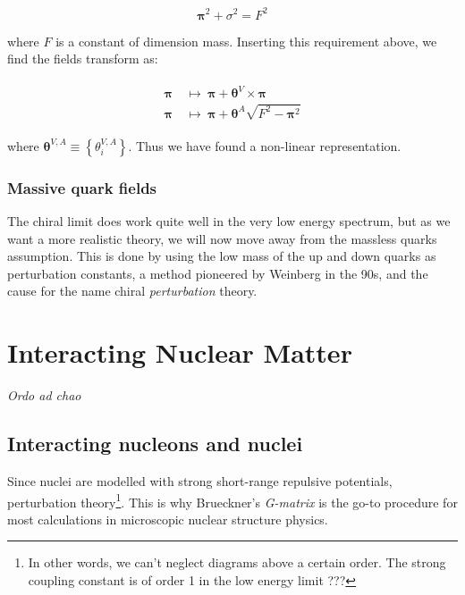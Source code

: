 \documentclass[10pt]{report}
\begin{document}
	\begin{equation}
		\bm{\pi}^2 + \sigma^2 = F^2
	\end{equation}
	
	where $F$ is a constant of dimension mass. Inserting this requirement above, we find the fields transform as:
	
	\begin{align}
		\begin{split}
			\bm{\pi} &\:\mapsto\: \bm{\pi} + \bm{\theta}^V\times\bm{\pi}\\
			\bm{\pi} &\:\mapsto\: \bm{\pi} + \bm{\theta}^A\sqrt{F^2 - \bm{\pi}^2}
		\end{split}
	\end{align}
	
	where $\bm{\theta}^{V,A}\equiv \left\{\theta_i^{V,A}\right\}$. Thus we have found a non-linear representation.
	
	\subsection{Massive quark fields}
	The chiral limit does work quite well in the very low energy spectrum, but as we want a more realistic theory, we will now move away from the massless quarks assumption. This is done by using the low mass of the up and down quarks as perturbation constants, a method pioneered by Weinberg in the 90s, and the cause for the name chiral \emph{perturbation} theory.\\
	
	
	
	
	\newpage
	\chapter{Interacting Nuclear Matter}
	
	\epigraph{\textit{Ordo ad chao}}{}
	
	\section{Interacting nucleons and nuclei}
	
	Since nuclei are modelled with strong short-range repulsive potentials, perturbation theory\footnote{In other words, we can't neglect diagrams above a certain order. The strong coupling constant is of order 1 in the low energy limit ???}. This is why Brueckner's \emph{G-matrix} is the go-to procedure for most calculations in microscopic nuclear structure physics.
	
\end{document}
